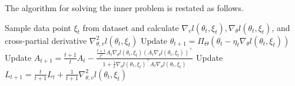 \documentclass[11 pt]{article}
\begin{document}
The algorithm for solving the inner problem is restated as follows.
\begin{algorithm}[h]
    \caption{Solving Inner Problem with SGD}
    \label{alg:inner_loop}
    \begin{algorithmic}[1]
            \STATE Sample data point $\xi_t$ from dataset and calculate $ \nabla_v l (\theta_{t},\xi_t), \nabla_\theta l (\theta_{t},\xi_t)$, and cross-partial derivative $\nabla_{\theta,v}^2 l (\theta_{t}, \xi_t)$
            \STATE Update $\theta_{t+1} = \Pi_\Theta \left(\theta_{t} - \eta_t \nabla_\theta l (\theta_{t},\xi_t)\right)$
            \STATE Update $A_{t+1}=\frac{t+1}{t}A_t-\frac{\frac{t+1}{t^2}A_t\nabla_\theta l (\theta_{t},\xi_t)\left(A_t\nabla_\theta l (\theta_{t},\xi_t)\right)^\top}{1+\frac{1}{t}\nabla_\theta l (\theta_{t},\xi_t)^\top A_t\nabla_\theta l (\theta_{t},\xi_t)}$
            \STATE Update
            $L_{t+1}=\frac{t}{t+1}L_{t} + \frac{1}{t+1}  \nabla_{\theta,v}^2l (\theta_{t}, \xi_t) $
        \ENDFOR
    \end{algorithmic}
    \end{algorithm}
    
\end{document}
